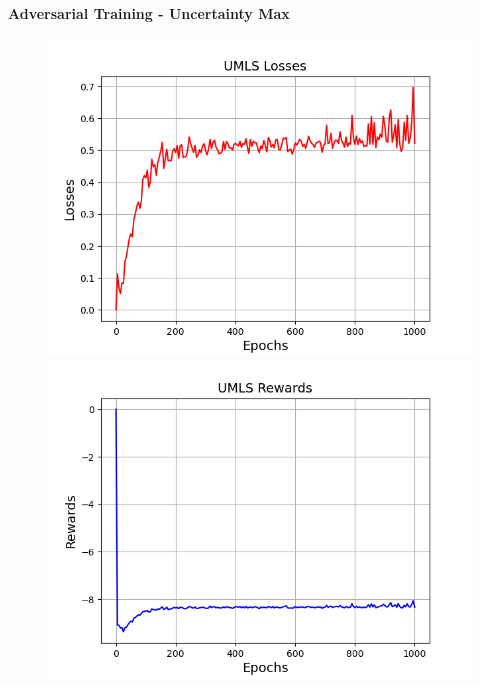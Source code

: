 \textbf{Adversarial Training - Uncertainty Max}\\
\begin{figure}
    \centering
    \begin{minipage}{.5\textwidth}
      \centering
      \includegraphics[width=0.9\linewidth]{figures/results/UMLS/AdversarialTraining/Uncertainty/Max/gan_train_umls_losses.png}
    \end{minipage}%
    \begin{minipage}{.5\textwidth}
      \centering
      \includegraphics[width=0.9\linewidth]{figures/results/UMLS/AdversarialTraining/Uncertainty/Max/gan_train_umls_rewards.png}
    \end{minipage}
    \begin{minipage}{.5\textwidth}
      \centering

\end{minipage}
\end{figure}
